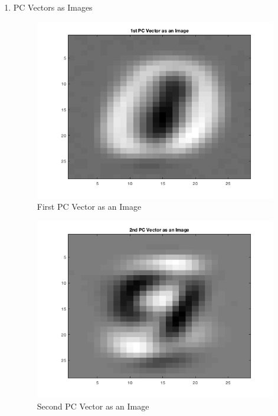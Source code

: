 \documentclass[english]{article}
\begin{document}
\begin{enumerate}
    \newpage
    \item PC Vectors as Images
    \begin{figure}[H]
    \centering
    \includegraphics[scale = 0.5]{fig321}
    \caption{First PC Vector as an Image}
    \label{fig:fig321}
    \end{figure}
    
    \begin{figure}[H]
    \centering
    \includegraphics[scale = 0.5]{fig322}
    \caption{Second PC Vector as an Image}
    \label{fig:fig322}
    \end{figure}
    

\end{enumerate}
\end{document}
